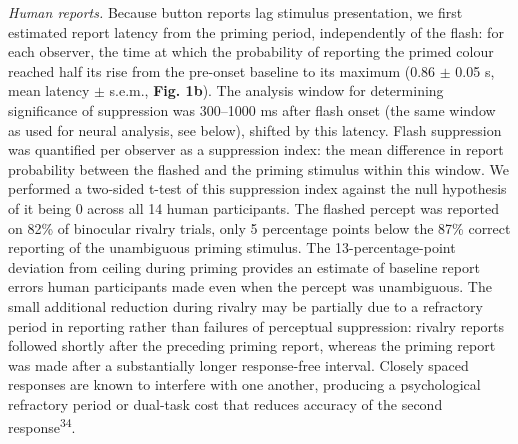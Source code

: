 \documentclass{article}
\begin{document}
\textit{Human reports.} Because button reports lag stimulus presentation, we first estimated report latency from the priming period, independently of the flash: for each observer, the time at which the probability of reporting the primed colour reached half its rise from the pre-onset baseline to its maximum (0.86 $\pm$ 0.05 s, mean latency $\pm$ s.e.m., \textbf{Fig. 1b}). The analysis window for determining significance of suppression was 300--1000 ms after flash onset (the same window as used for neural analysis, see below), shifted by this latency. Flash suppression was quantified per observer as a suppression index: the mean difference in report probability between the flashed and the priming stimulus within this window. We performed a two-sided t-test of this suppression index against the null hypothesis of it being 0 across all 14 human participants. The flashed percept was reported on 82\% of binocular rivalry trials, only 5 percentage points below the 87\% correct reporting of the unambiguous priming stimulus. The 13-percentage-point deviation from ceiling during priming provides an estimate of baseline report errors human participants made even when the percept was unambiguous. The small additional reduction during rivalry may be partially due to a refractory period in reporting rather than failures of perceptual suppression: rivalry reports followed shortly after the preceding priming report, whereas the priming report was made after a substantially longer response-free interval. Closely spaced responses are known to interfere with one another, producing a psychological refractory period or dual-task cost that reduces accuracy of the second response\textsuperscript{34}.
\end{document}
